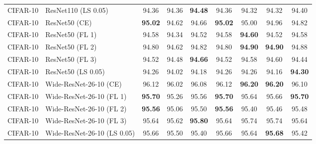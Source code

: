 \begin{table}[h!]
{\begin{tabular}{llccccccc}
    CIFAR-10 &         ResNet110 (LS 0.05) &                  94.36 &                  94.36 & \textbf{94.48} &                  94.36 &                  94.32 &                  94.32 &                  94.40 \\
    CIFAR-10 &               ResNet50 (CE) & \textbf{95.02} &                  94.62 &                  94.66 & \textbf{95.02} &                  95.00 &                  94.96 &                  94.82 \\
    CIFAR-10 &             ResNet50 (FL 1) &                  94.58 &                  94.34 &                  94.52 &                  94.58 & \textbf{94.60} &                  94.52 &                  94.58 \\
    CIFAR-10 &             ResNet50 (FL 2) &                  94.80 &                  94.62 &                  94.82 &                  94.80 & \textbf{94.90} & \textbf{94.90} &                  94.88 \\
    CIFAR-10 &             ResNet50 (FL 3) &                  94.52 &                  94.48 & \textbf{94.66} &                  94.52 &                  94.58 &                  94.60 &                  94.44 \\
    CIFAR-10 &          ResNet50 (LS 0.05) &                  94.26 &                  94.02 &                  94.18 &                  94.26 &                  94.26 &                  94.16 & \textbf{94.30} \\
    CIFAR-10 &      Wide-ResNet-26-10 (CE) &                  96.12 &                  96.02 &                  96.08 &                  96.12 & \textbf{96.20} & \textbf{96.20} &                  96.10 \\
    CIFAR-10 &    Wide-ResNet-26-10 (FL 1) & \textbf{95.70} &                  95.26 &                  95.56 & \textbf{95.70} &                  95.64 &                  95.66 & \textbf{95.70} \\
    CIFAR-10 &    Wide-ResNet-26-10 (FL 2) & \textbf{95.56} &                  95.06 &                  95.50 & \textbf{95.56} &                  95.40 &                  95.46 &                  95.48 \\
    CIFAR-10 &    Wide-ResNet-26-10 (FL 3) &                  95.64 &                  95.62 & \textbf{95.80} &                  95.64 &                  95.74 &                  95.74 &                  95.64 \\
    CIFAR-10 & Wide-ResNet-26-10 (LS 0.05) &                  95.66 &                  95.50 &                  95.40 &                  95.66 &                  95.64 & \textbf{95.68} &                  95.42 \\

\end{tabular}}
\end{table}
